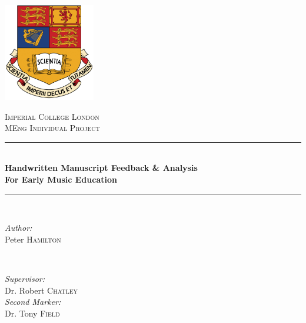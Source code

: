 
\begin{titlepage}

\newcommand{\HRule}{\rule{\linewidth}{0.5mm}} %

\begin{center} %


\includegraphics[width=0.3\textwidth]{gfx/icl-crest.jpg}

\textsc{\LARGE Imperial College London}\\[1.5cm] %
\textsc{\Large MEng Individual Project}\\[0.5cm] %


\HRule \\[0.4cm]
{ \Large \bfseries Handwritten Manuscript Feedback \& Analysis }\\[0.4cm]
{ \large \bfseries For Early Music Education }\\[0.3cm]
\HRule \\[1.5cm]


\begin{minipage}{0.4\textwidth}
\begin{flushleft} \large
\emph{Author:}\\
Peter \textsc{Hamilton}
\end{flushleft}
\end{minipage}
~
\begin{minipage}{0.4\textwidth}
\begin{flushright} \large
\emph{Supervisor:} \\
Dr. Robert \textsc{Chatley}
\\[0.5cm]
\emph{Second Marker:} \\
Dr. Tony \textsc{Field}
\end{flushright}
\end{minipage}\\[4cm]


\end{center}
\end{titlepage}
